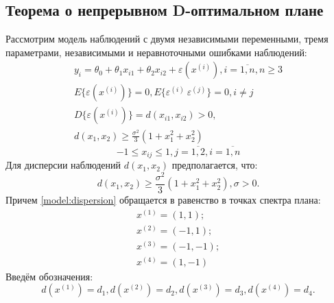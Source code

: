 \subsection{Теорема о непрерывном D-оптимальном плане}
Рассмотрим модель наблюдений с двумя независимыми переменными, тремя параметрами, независимыми и неравноточными ошибками наблюдений:
\begin{gather} \label{model:start}
y_i = \theta_0 + \theta_1 x_{i1} + \theta_2 x_{i2} + \varepsilon(x^{(i)}), i = \overline{1, n}, n \ge 3 \\
E\{ \varepsilon(x^{(i)}) \} = 0, E\{ \varepsilon^{(i)}\ \varepsilon^{(j)} \} = 0, i \ne j \\
D\{ \varepsilon(x^{(i)}) \} = d(x_{i1}, x_{i2}) > 0, \\
d(x_1, x_2) \ge \frac{\sigma^2}{3}(1 + x_1^2 + x_2^2) \label{model:end}
\end{gather}
$$ -1 \le x_{ij} \le 1, j = \overline{1, 2}, i = \overline{1, n}$$
Для дисперсии наблюдений $d(x_1, x_2)$ предполагается, что:
\begin{equation}\label{model:dispersion}
d(x_1, x_2) \ge \frac{\sigma^2}{3}(1 + x_1^2 + x_2^2), \sigma > 0.
\end{equation}
Причем \eqref{model:dispersion} обращается в равенство в точках спектра плана:
\begin{equation}\label{plan-points}
\begin{gathered}
x^{(1)}=(1, 1); \\
x^{(2)}=(-1, 1); \\
x^{(3)}=(-1, -1); \\
x^{(4)}=(1, -1)
\end{gathered}
\end{equation}
Введём обозначения:
\begin{equation}
d(x^{(1)}) = d_1, d(x^{(2)}) = d_2, d(x^{(3)}) = d_3, d(x^{(4)}) = d_4.
\end{equation}

